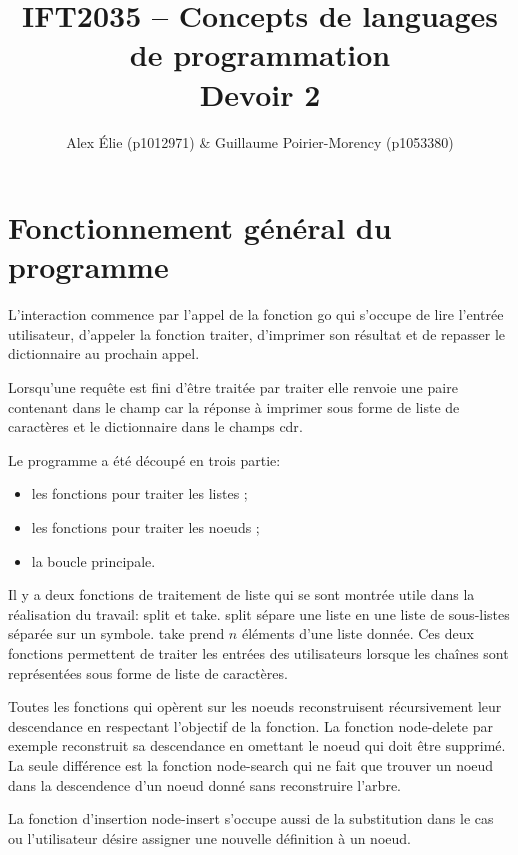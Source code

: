 \documentclass{article}
\title{IFT2035 -- Concepts de languages de programmation \\ Devoir 2}
\author{Alex Élie (p1012971) \& Guillaume Poirier-Morency (p1053380)}
\begin{document}
  \maketitle

  \abstract

  \section{Fonctionnement général du programme}
  L'interaction commence par l'appel de la fonction \textsf{go} qui s'occupe de
  lire l'entrée utilisateur, d'appeler la fonction \textsf{traiter}, d'imprimer
  son résultat et de repasser le dictionnaire au prochain appel.

  Lorsqu'une requête est fini d'être traitée par \textsf{traiter} elle renvoie
  une paire contenant dans le champ \textsf{car} la réponse à imprimer sous
  forme de liste de caractères et le dictionnaire dans le champs \textsf{cdr}.

  Le programme a été découpé en trois partie:
  \begin{itemize}
    \item les fonctions pour traiter les listes ;
    \item les fonctions pour traiter les noeuds ;
    \item la boucle principale.
  \end{itemize}

  Il y a deux fonctions de traitement de liste qui se sont montrée utile dans la
  réalisation du travail: \textsf{split} et \textsf{take}. \textsf{split} sépare
  une liste en une liste de sous-listes séparée sur un symbole. \textsf{take}
  prend $n$ éléments d'une liste donnée. Ces deux fonctions permettent de
  traiter les entrées des utilisateurs lorsque les chaînes sont représentées
  sous forme de liste de caractères.

  Toutes les fonctions qui opèrent sur les noeuds reconstruisent récursivement
  leur descendance en respectant l'objectif de la fonction. La fonction
  \textsf{node-delete} par exemple reconstruit sa descendance en omettant le
  noeud qui doit être supprimé. La seule différence est la fonction
  \textsf{node-search} qui ne fait que trouver un noeud dans la descendence d'un
  noeud donné sans reconstruire l'arbre.

  La fonction d'insertion \textsf{node-insert} s'occupe aussi de la substitution
  dans le cas ou l'utilisateur désire assigner une nouvelle définition à un
  noeud.
\end{document}
